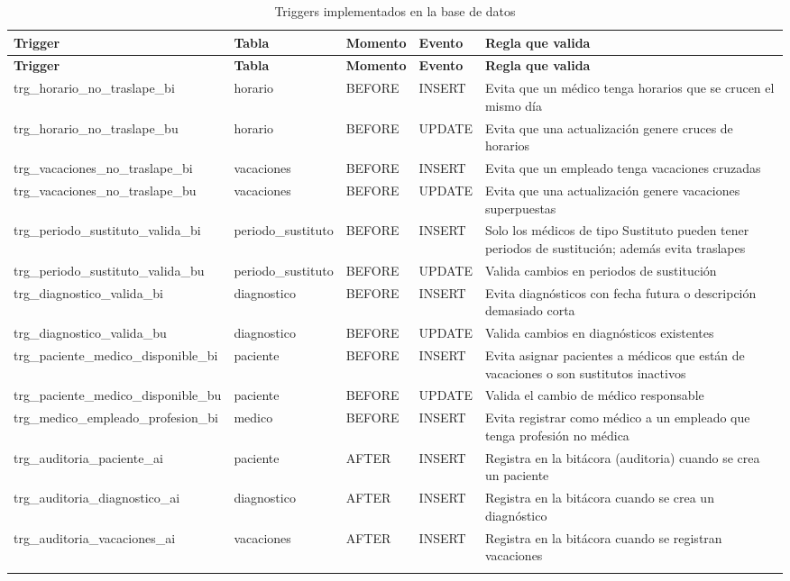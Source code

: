 \documentclass[12pt,a4paper]{article}
\begin{document}
{\small\begin{longtable}{|p{3.5cm}|p{2cm}|p{2cm}|p{1.5cm}|p{6cm}|}
\hline
\textbf{Trigger} & \textbf{Tabla} & \textbf{Momento} & \textbf{Evento} & \textbf{Regla que valida} \\ \hline
\endfirsthead
\hline
\textbf{Trigger} & \textbf{Tabla} & \textbf{Momento} & \textbf{Evento} & \textbf{Regla que valida} \\ \hline
\endhead

trg\_horario\_no\_traslape\_bi & horario & BEFORE & INSERT & Evita que un médico tenga horarios que se crucen el mismo día \\ \hline
trg\_horario\_no\_traslape\_bu & horario & BEFORE & UPDATE & Evita que una actualización genere cruces de horarios \\ \hline
trg\_vacaciones\_no\_traslape\_bi & vacaciones & BEFORE & INSERT & Evita que un empleado tenga vacaciones cruzadas \\ \hline
trg\_vacaciones\_no\_traslape\_bu & vacaciones & BEFORE & UPDATE & Evita que una actualización genere vacaciones superpuestas \\ \hline
trg\_periodo\_sustituto\_valida\_bi & periodo\_sustituto & BEFORE & INSERT & Solo los médicos de tipo Sustituto pueden tener periodos de sustitución; además evita traslapes \\ \hline
trg\_periodo\_sustituto\_valida\_bu & periodo\_sustituto & BEFORE & UPDATE & Valida cambios en periodos de sustitución \\ \hline
trg\_diagnostico\_valida\_bi & diagnostico & BEFORE & INSERT & Evita diagnósticos con fecha futura o descripción demasiado corta \\ \hline
trg\_diagnostico\_valida\_bu & diagnostico & BEFORE & UPDATE & Valida cambios en diagnósticos existentes \\ \hline
trg\_paciente\_medico\_disponible\_bi & paciente & BEFORE & INSERT & Evita asignar pacientes a médicos que están de vacaciones o son sustitutos inactivos \\ \hline
trg\_paciente\_medico\_disponible\_bu & paciente & BEFORE & UPDATE & Valida el cambio de médico responsable \\ \hline
trg\_medico\_empleado\_profesion\_bi & medico & BEFORE & INSERT & Evita registrar como médico a un empleado que tenga profesión no médica \\ \hline
trg\_auditoria\_paciente\_ai & paciente & AFTER & INSERT & Registra en la bitácora (auditoria) cuando se crea un paciente \\ \hline
trg\_auditoria\_diagnostico\_ai & diagnostico & AFTER & INSERT & Registra en la bitácora cuando se crea un diagnóstico \\ \hline
trg\_auditoria\_vacaciones\_ai & vacaciones & AFTER & INSERT & Registra en la bitácora cuando se registran vacaciones \\ \hline
\caption{Triggers implementados en la base de datos}
\end{longtable}}
\end{document}
